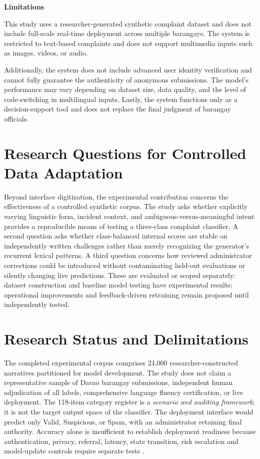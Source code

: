 \textbf{Limitations}

This study uses a researcher-generated synthetic complaint dataset and does not include full-scale real-time deployment across multiple barangays. The system is restricted to text-based complaints and does not support multimedia inputs such as images, videos, or audio.

Additionally, the system does not include advanced user identity verification and cannot fully guarantee the authenticity of anonymous submissions. The model's performance may vary depending on dataset size, data quality, and the level of code-switching in multilingual inputs. Lastly, the system functions only as a decision-support tool and does not replace the final judgment of barangay officials.


\section{Research Questions for Controlled Data Adaptation}
Beyond interface digitization, the experimental contribution concerns the effectiveness of a controlled synthetic corpus. The study asks whether explicitly varying linguistic form, incident context, and ambiguous-versus-meaningful intent provides a reproducible means of testing a three-class complaint classifier. A second question asks whether class-balanced internal scores are stable on independently written challenges rather than merely recognizing the generator's recurrent lexical patterns. A third question concerns how reviewed administrator corrections could be introduced without contaminating held-out evaluations or silently changing live predictions. These are evaluated or scoped separately: dataset construction and baseline model testing have experimental results; operational improvements and feedback-driven retraining remain proposed until independently tested.

\section{Research Status and Delimitations}
The completed experimental corpus comprises 24,000 researcher-constructed narratives partitioned for model development. The study does not claim a representative sample of Davao barangay submissions, independent human adjudication of all labels, comprehensive language fluency certification, or live deployment. The 118-item category register is a \emph{scenario and auditing framework}; it is not the target output space of the classifier. The deployment interface would predict only Valid, Suspicious, or Spam, with an administrator retaining final authority. Accuracy alone is insufficient to establish deployment readiness because authentication, privacy, referral, latency, state transition, risk escalation and model-update controls require separate tests \cite{ribeiro,sklearn}.
